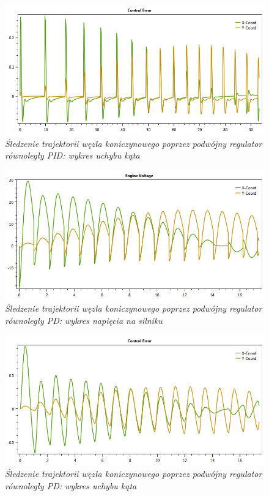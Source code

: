 \documentclass[12pt, oneside]{report}
\theoremstyle{definition}
\begin{document}
\begin{figure}[H]
	\centering
		\includegraphics[width = 320pt]{TrefoilKnotParallelCE} 
		\caption{\textit{Śledzenie trajektorii węzła koniczynowego poprzez podwójny regulator równoległy PID: wykres uchybu kąta}}
		\label{plot:TrefoilKnotParallelCE}
\end{figure}

\begin{figure}[H]
	\centering
		\includegraphics[width = 320pt]{TrefoilKnotPDEV} 
		\caption{\textit{Śledzenie trajektorii węzła koniczynowego poprzez podwójny regulator równoległy PD: wykres napięcia na silniku}}
		\label{plot:TrefoilKnotPDEV}
\end{figure}

\begin{figure}[H]
	\centering
		\includegraphics[width = 320pt]{TrefoilKnotPDCE} 
		\caption{\textit{Śledzenie trajektorii węzła koniczynowego poprzez podwójny regulator równoległy PD: wykres uchybu kąta}}
		\label{plot:TrefoilKnotPDCE}
\end{figure}
\end{document}
